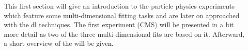 
\label{sec:experiments}

This first section will give an introduction to the particle physics experiments which feature some multi-dimensional fitting tasks and are later on approached with the \gls{dl} techniques. The first experiment (CMS) will be presented in a bit more detail as two of the three multi-dimensional fits are based on it. Afterward, a short overview of the \pao{} will be given.



